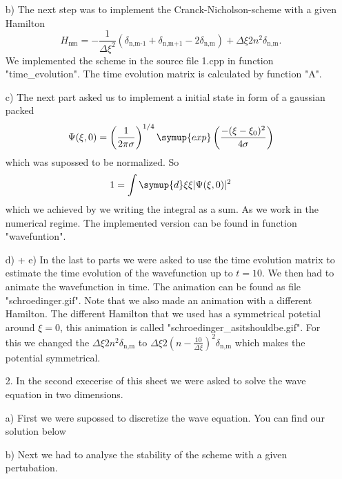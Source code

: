 \begin{itemize}
\begin{itemize}
        \FloatBarrier
        \item[b)]
        The next step was to implement the Cranck-Nicholson-scheme with a given Hamilton
        \begin{equation}
            H_\text{nm} = - \frac{1}{\Delta \xi ^2} (\delta_\text{n,m-1} + \delta_\text{n,m+1} - 2\delta_\text{n,m}) + \Delta \xi 2n^2 \delta_\text{n,m} . 
        \end{equation}
        We implemented the scheme in the source file 1.cpp in function "time\_evolution".
        The time evolution matrix is calculated by function "A".
        \item[c)]
        The next part asked us to implement a initial state in form of a gaussian packed 
        \begin{equation}
            \Psi(\xi,0) = \left(\frac{1}{2\pi\sigma}\right)^{1/4} \symup{exp}\left(\frac{-(\xi - \xi_0)^2}{4\sigma}\right)
        \end{equation}
        which was supossed to be normalized.
        So
        \begin{equation}
            1 = \int \symup{d}\xi \xi |\Psi(\xi,0)|^2
        \end{equation}
        which we achieved by we writing the integral as a sum.
        As we work in the numerical regime.
        The implemented version can be found in function "wavefuntion".
        \item[d) + e)]
        In the last to parts we were asked to use the time evolution matrix to estimate the time evolution of the wavefunction up to $t=10$.
        We then had to animate the wavefunction in time.
        The animation can be found as file "schroedinger.gif".
        Note that we also made an animation with a different Hamilton.
        The different Hamilton that we used has a symmetrical potetial around $\xi = 0$, this animation is called "schroedinger\_asitshouldbe.gif".
        For this we changed the $\Delta \xi 2n^2 \delta_\text{n,m}$ to $\Delta \xi 2(n - \frac{10}{\Delta \xi})^2 \delta_\text{n,m}$ which makes the potential symmetrical.
        \FloatBarrier
    \item[2.]
    \FloatBarrier
        In the second execerise of this sheet we were asked to solve the wave equation in two dimensions.
        \item[a)]
        First we were supossed to discretize the wave equation.
        You can find our solution below 


        \FloatBarrier
        \item[b)]
        \FloatBarrier
        Next we had to analyse the stability of the scheme with a given pertubation.


\end{itemize}
\end{itemize}
